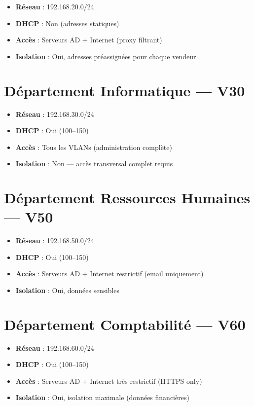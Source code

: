 \begin{itemize}
    \item \textbf{Réseau} : 192.168.20.0/24
    \item \textbf{DHCP} : Non (adresses statiques)
    \item \textbf{Accès} : Serveurs AD + Internet (proxy filtrant)
    \item \textbf{Isolation} : Oui, adresses préassignées pour chaque vendeur
\end{itemize}

\section{Département Informatique — V30}

\begin{itemize}
    \item \textbf{Réseau} : 192.168.30.0/24
    \item \textbf{DHCP} : Oui (100–150)
    \item \textbf{Accès} : Tous les VLANs (administration complète)
    \item \textbf{Isolation} : Non — accès transversal complet requis
\end{itemize}

\section{Département Ressources Humaines — V50}

\begin{itemize}
    \item \textbf{Réseau} : 192.168.50.0/24
    \item \textbf{DHCP} : Oui (100–150)
    \item \textbf{Accès} : Serveurs AD + Internet restrictif (email uniquement)
    \item \textbf{Isolation} : Oui, données sensibles
\end{itemize}

\section{Département Comptabilité — V60}

\begin{itemize}
    \item \textbf{Réseau} : 192.168.60.0/24
    \item \textbf{DHCP} : Oui (100–150)
    \item \textbf{Accès} : Serveurs AD + Internet très restrictif (HTTPS only)
    \item \textbf{Isolation} : Oui, isolation maximale (données financières)
\end{itemize}

